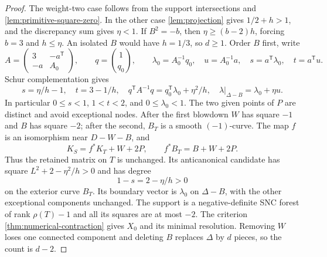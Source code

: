 \documentclass[11pt,reqno]{amsart}
\theoremstyle{definition}
\theoremstyle{remark}
\numberwithin{equation}{section}
\begin{document}
\begin{proof}
The weight-two case follows from the support intersections and
\cref{lem:primitive-square-zero}. In the other case \cref{lem:projection} gives
$1/2+h>1$, and the discrepancy sum gives $\eta<1$.
If $B^2=-b$, then $\eta\ge(b-2)h$, forcing $b=3$ and $h\le\eta$.
An isolated $B$ would have $h=1/3$, so $d\ge1$.
Order $B$ first, write
\[
 A=\begin{pmatrix}3&-a^{\mathsf T}\\-a&A_0\end{pmatrix},\qquad
 q=\binom1{q_0},\qquad
 \lambda_0=A_0^{-1}q_0,\quad u=A_0^{-1}a,
 \quad s=a^{\mathsf T}\lambda_0,\quad t=a^{\mathsf T}u.
\]
Schur complementation gives
\begin{equation}\label{eq:isolated-mixed-st}
 s=\eta/h-1,\quad t=3-1/h,\quad
 q^{\mathsf T}A^{-1}q=q_0^{\mathsf T}\lambda_0+\eta^2/h,
 \quad \lambda|_{\Delta-B}=\lambda_0+\eta u.
\end{equation}
In particular $0\le s<1$, $1<t<2$, and $0\le\lambda_0<1$.
The two given points of $P$ are distinct and avoid exceptional nodes.
After the first blowdown $W$ has square $-1$ and $B$ has square $-2$;
after the second, $B_T$ is a smooth $(-1)$-curve.
The map $f$ is an isomorphism near $D-W-B$, and
\[
 K_S=f^*K_T+W+2P,\qquad f^*B_T=B+W+2P.
\]
Thus the retained matrix on $T$ is unchanged. Its anticanonical
candidate has square $L^2+2-\eta^2/h>0$ and has degree
\[
 1-s=2-\eta/h>0
\]
on the exterior curve $B_T$.
Its boundary vector is $\lambda_0$ on $\Delta-B$, with the other
exceptional components unchanged. The support is a negative-definite SNC
forest of rank $\rho(T)-1$ and all its squares are at most $-2$.
The criterion \cref{thm:numerical-contraction} gives $X_0$ and its minimal
resolution. Removing $W$ loses one connected component and deleting $B$ replaces
$\Delta$ by $d$ pieces, so the count is $d-2$.


\end{proof}
\end{document}
